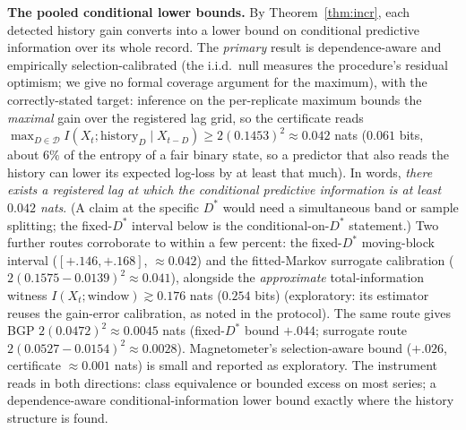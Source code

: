 \documentclass[acmsmall,screen,review,anonymous]{acmart}
\begin{document}
\textbf{The pooled conditional lower bounds.} By
Theorem~\ref{thm:incr}, each detected history gain converts into a lower
bound on conditional predictive information over its whole record. The \emph{primary} result is dependence-aware and
empirically selection-calibrated (the i.i.d.\ null measures the
procedure's residual optimism; we give no formal coverage argument for the
maximum), with the correctly-stated target: inference on the per-replicate maximum bounds the
\emph{maximal} gain over the registered lag grid, so the certificate
reads
$\max_{D\in\mathcal D} I(X_t;\text{history}_D\mid X_{t-D})
\ge 2(0.1453)^2\approx0.042$ nats ($0.061$ bits, about $6\%$ of the
entropy of a fair binary state, so a predictor that also reads the history
can lower its expected log-loss by at least that much). In words, \emph{there exists a registered
lag at which the conditional predictive information is at least
$0.042$ nats}. (A claim at the specific $D^*$ would need a simultaneous
band or sample splitting; the fixed-$D^*$ interval below is the
conditional-on-$D^*$ statement.) Two further routes
corroborate to within a few percent: the fixed-$D^*$ moving-block
interval ($[+.146,+.168]$, $\approx0.042$) and the fitted-Markov
surrogate calibration ($2(0.1575-0.0139)^2\approx0.041$), alongside the \emph{approximate} total-information witness
$I(X_t;\text{window})\gtrsim0.176$ nats ($0.254$ bits) (exploratory: its estimator
reuses the gain-error calibration, as noted in the protocol). The same
route gives BGP $2(0.0472)^2\approx0.0045$ nats (fixed-$D^*$ bound $+.044$;
surrogate route $2(0.0527-0.0154)^2\approx0.0028$). Magnetometer's selection-aware bound ($+.026$, certificate
$\approx0.001$ nats) is small and reported as exploratory. The instrument reads in
both directions: class equivalence or bounded excess on most series; a
dependence-aware conditional-information lower bound exactly where the
history structure is found.
\end{document}
